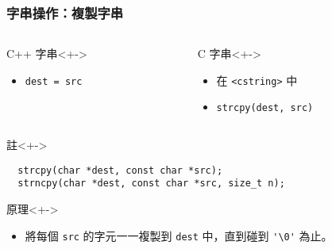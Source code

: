 \documentclass[utf8]{beamer}
\begin{document}
\begin{CJK}{UTF8}{bkai}
\begin{frame}[fragile]
  \frametitle{字串操作：複製字串}
  \begin{columns}[T]
    \begin{column}[T]{5.5cm}
    \begin{block}{C++ 字串}<+->
      \begin{itemize}
      \item \lstinline{dest = src}{}
      \end{itemize}
    \end{block}
    \end{column}
    \begin{column}[T]{5.5cm}
    \begin{block}{C 字串}<+->
      \begin{itemize}[<+->]
      \item 在 \lstinline{<cstring>}{} 中
      \item \lstinline{strcpy(dest, src)}{}
      \end{itemize}
    \end{block}
    \end{column}
  \end{columns}
  \begin{alertblock}{註}<+->
    \begin{lstlisting}
  strcpy(char *dest, const char *src);
  strncpy(char *dest, const char *src, size_t n);
    \end{lstlisting}
  \end{alertblock}
  \begin{exampleblock}{原理}<+->
    \begin{itemize}
    \item 將每個 \lstinline{src}{} 的字元一一複製到 \lstinline{dest}{} 中，直到\alert{碰到} \lstinline{'\0'}{} 為止。
    \end{itemize}
  \end{exampleblock}
\end{frame}


\end{CJK}
\end{document}
